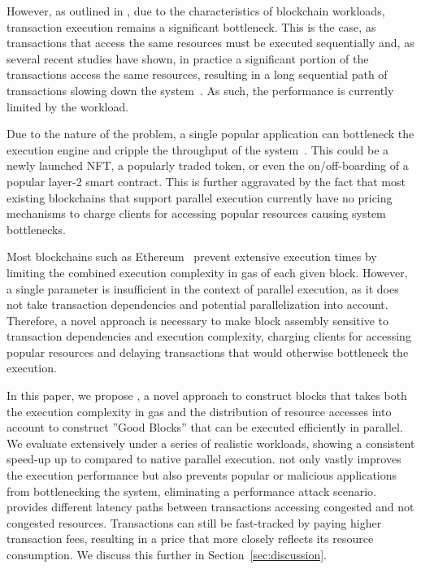 However, as outlined in \cite{chiron}, due to the characteristics of blockchain workloads, transaction execution remains a significant bottleneck.
This is the case, as transactions that access the same resources must be executed sequentially and, as several recent studies have shown, in practice a significant portion of the transactions access the same resources, resulting in a long sequential path of transactions slowing down the system~\cite{ethparallelimpro,chiron}.
As such, the performance is currently limited by the workload.

Due to the nature of the problem, a single popular application can bottleneck the execution engine and cripple the throughput of the system~\cite{chiron}.
This could be a newly launched NFT, a popularly traded token, or even the on/off-boarding of a popular layer-2 smart contract.
This is further aggravated by the fact that most existing blockchains that support parallel execution currently have no pricing mechanisms to charge clients for accessing popular resources causing system bottlenecks.

Most blockchains such as Ethereum~\cite{ethereum} prevent extensive execution times by limiting the combined execution complexity in gas of each given block.
However, a single parameter is insufficient in the context of parallel execution, as it does not take transaction dependencies and potential parallelization into account. Therefore, a novel approach is necessary to make block assembly sensitive to transaction dependencies and execution complexity, charging clients for accessing popular resources and delaying transactions that would otherwise bottleneck the execution. 

In this paper, we propose \sys, a novel approach to construct blocks that takes both the execution complexity in gas and the distribution of resource accesses into account to construct ''Good Blocks'' that can be executed efficiently in parallel. We evaluate \sys extensively under a series of realistic workloads, showing a consistent speed-up up to \sysmax compared to native parallel execution.
\sys not only vastly improves the execution performance but also prevents popular or malicious applications from bottlenecking the system, eliminating a performance attack scenario.
\sys provides different latency paths between transactions accessing congested and not congested resources. Transactions can still be fast-tracked by paying higher transaction fees, resulting in a price that more closely reflects its resource consumption. We discuss this further in Section~\ref{sec:discussion}.

